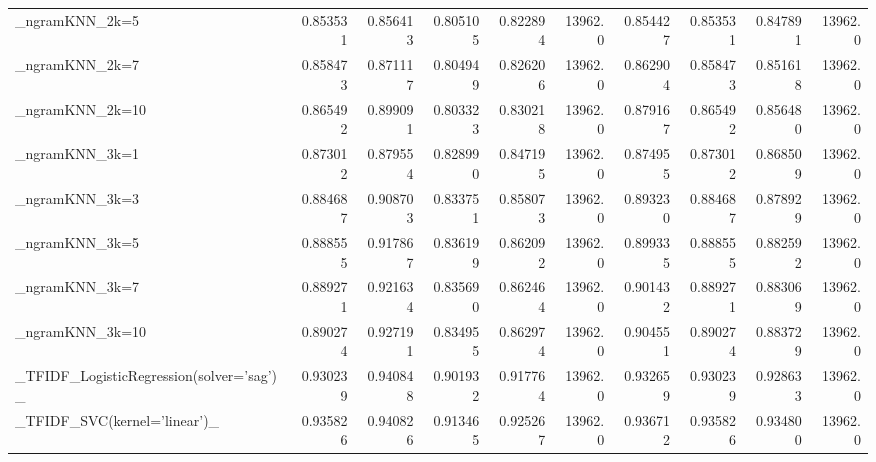 \begin{tabular}{lrrrrrrrrr}
\_ngramKNN\_2k=5                                     &  0.853531 &         0.856413 &      0.805105 &        0.822894 &        13962.0 &            0.854427 &         0.853531 &           0.847891 &           13962.0 \\
\_ngramKNN\_2k=7                                     &  0.858473 &         0.871117 &      0.804949 &        0.826206 &        13962.0 &            0.862904 &         0.858473 &           0.851618 &           13962.0 \\
\_ngramKNN\_2k=10                                    &  0.865492 &         0.899091 &      0.803323 &        0.830218 &        13962.0 &            0.879167 &         0.865492 &           0.856480 &           13962.0 \\
\_ngramKNN\_3k=1                                     &  0.873012 &         0.879554 &      0.828990 &        0.847195 &        13962.0 &            0.874955 &         0.873012 &           0.868509 &           13962.0 \\
\_ngramKNN\_3k=3                                     &  0.884687 &         0.908703 &      0.833751 &        0.858073 &        13962.0 &            0.893230 &         0.884687 &           0.878929 &           13962.0 \\
\_ngramKNN\_3k=5                                     &  0.888555 &         0.917867 &      0.836199 &        0.862092 &        13962.0 &            0.899335 &         0.888555 &           0.882592 &           13962.0 \\
\_ngramKNN\_3k=7                                     &  0.889271 &         0.921634 &      0.835690 &        0.862464 &        13962.0 &            0.901432 &         0.889271 &           0.883069 &           13962.0 \\
\_ngramKNN\_3k=10                                    &  0.890274 &         0.927191 &      0.834955 &        0.862974 &        13962.0 &            0.904551 &         0.890274 &           0.883729 &           13962.0 \\
\_TFIDF\_LogisticRegression(solver='sag')\_           &  0.930239 &         0.940848 &      0.901932 &        0.917764 &        13962.0 &            0.932659 &         0.930239 &           0.928633 &           13962.0 \\
\_TFIDF\_SVC(kernel='linear')\_                       &  0.935826 &         0.940826 &      0.913465 &        0.925267 &        13962.0 &            0.936712 &         0.935826 &           0.934800 &           13962.0 \\

\end{tabular}
